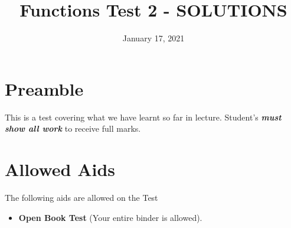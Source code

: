 \documentclass[12pt]{article} %
\title{Functions Test 2 - SOLUTIONS}
\date{January 17, 2021}
\begin{document}
    \renewcommand*{\coursecode}{MCR3U Quiz} %
    \renewcommand*{\assgnnumber}{1} %
    \renewcommand*{\submdate}{November, 2021} %
    \renewcommand*{\studentfname}{\textbf{Name:}} %
    \renewcommand*{\studentlname}{} %

    \renewcommand\qedsymbol{$\blacksquare$}
    \setfigpath
    \fancyhfoffset[L,O]{0pt} %




	\maketitle
	\section{Preamble}
	This is a test covering what we have learnt so far in lecture. Student's \emph{\textbf{must show all work}} to receive full marks.
	\section{Allowed Aids}
	The following aids are allowed on the Test
	\begin{itemize}
    \item \textbf{Open Book Test} (Your entire binder is allowed).
	\end{itemize}
\end{document}
